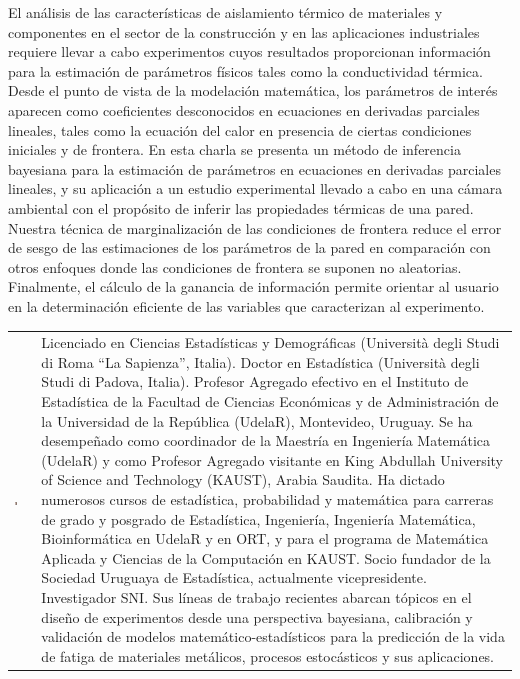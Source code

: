 \noindent El análisis de las características de aislamiento térmico de materiales y componentes en el sector de la construcción y en las aplicaciones industriales requiere llevar a cabo experimentos cuyos resultados proporcionan información para la estimación de parámetros físicos tales como la conductividad térmica. Desde el punto de vista de la modelación matemática, los parámetros de interés aparecen como coeficientes desconocidos en ecuaciones en derivadas parciales lineales, tales como la ecuación del calor en presencia de ciertas condiciones iniciales y de frontera. En esta charla se presenta un método de inferencia bayesiana para la estimación de parámetros en ecuaciones en derivadas parciales lineales, y su aplicación a un estudio experimental llevado a cabo en una cámara ambiental con el propósito de inferir las propiedades térmicas de una pared. Nuestra técnica de marginalización de las condiciones de frontera reduce el error de sesgo de las estimaciones de los parámetros de la pared en comparación con otros enfoques donde las condiciones de frontera se suponen no aleatorias. Finalmente, el cálculo de la ganancia de información permite orientar al usuario en la determinación eficiente de las variables que caracterizan al experimento.

\begin{table}[H]
\centering
\begin{tabular}{m{}  m{}}
\begin{center} 
\includegraphics[width=0.2\textwidth]{./fotos/scavino} \end{center} & 
\noindent \small{Licenciado en Ciencias Estadísticas y Demográficas (Università degli Studi di Roma “La Sapienza”, Italia). Doctor en Estadística (Università degli Studi di Padova, Italia). Profesor Agregado efectivo en el Instituto de Estadística de la Facultad de Ciencias Económicas y de Administración de la
Universidad de la República (UdelaR), Montevideo, Uruguay. Se ha desempeñado como coordinador de la Maestría en Ingeniería Matemática (UdelaR) y como Profesor Agregado visitante en King Abdullah University of Science and Technology (KAUST), Arabia Saudita. Ha dictado numerosos cursos de estadística, probabilidad y matemática para carreras de grado y posgrado de Estadística, Ingeniería, Ingeniería Matemática, Bioinformática en UdelaR y en ORT, y para el programa de Matemática Aplicada y Ciencias de la Computación en KAUST. Socio fundador de la Sociedad Uruguaya de Estadística, actualmente vicepresidente. Investigador SNI. Sus líneas de trabajo recientes abarcan tópicos en el diseño de experimentos desde una perspectiva bayesiana, calibración y validación de modelos matemático-estadísticos para la predicción de la vida de fatiga de materiales metálicos, procesos estocásticos y sus aplicaciones.} \\
\end{tabular}
\end{table}

